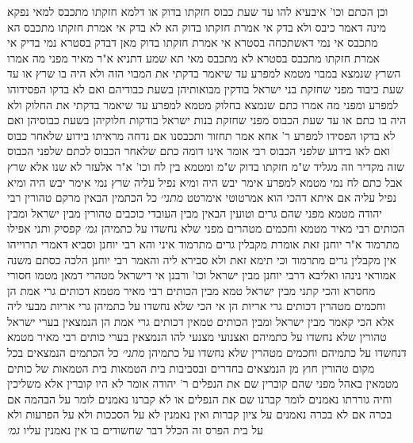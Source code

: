 \documentclass[12pt, openany]{book}
\begin{document}
{וכן הכתם וכו' איבעיא להו עד שעת כבוס חזקתו בדוק או דלמא חזקתו מתכבס 
למאי נפקא מינה דאמר כיבס ולא בדק אי אמרת חזקתו בדוק הא לא בדק אי אמרת חזקתו מתכבס הא מתכבס 
אי נמי דאשתכחה בסטרא אי אמרת חזקתו בדוק מאן דבדק בסטרא נמי בדיק אי אמרת חזקתו מתכבס בסטרא לא מתכבס 
מאי תא שמע דתניא א"ר מאיר מפני מה אמרו השרץ שנמצא במבוי מטמא למפרע עד שיאמר בדקתי את המבוי הזה ולא היה בו שרץ או עד שעת כיבוד מפני שחזקת בני ישראל בודקין מבואותיהן בשעת כבודיהם ואם לא בדקו הפסידוהו למפרע 
ומפני מה אמרו כתם שנמצא בחלוק מטמא למפרע עד שיאמר בדקתי את החלוק ולא היה בו כתם או עד שעת הכבוס מפני שחזקת בנות ישראל בודקות חלוקיהן בשעת כבוסיהן ואם לא בדקו הפסידו למפרע 
ר' אחא אמר תחזור ותכבסנו אם נדחה מראיתו בידוע שלאחר כבוס ואם לאו בידוע שלפני הכבוס 
רבי אומר אינו דומה כתם שלאחר הכבוס לכתם שלפני הכבוס שזה מקדיר וזה מגליד ש"מ חזקתו בדוק ש"מ
ומטמא בין לח וכו' א"ר אלעזר לא שנו אלא שרץ אבל כתם לח נמי מטמא למפרע אימר יבש היה ומיא נפיל עליה 
שרץ נמי אימר יבש היה ומיא נפיל עליה אם איתא דהכי הוא אמרטוטי אימרטט
{\large\emph{מתני׳}} כל הכתמין הבאין מרקם טהורין רבי יהודה מטמא מפני שהם גרים וטועין הבאין מבין העובדי כוכבים טהורין מבין ישראל ומבין הכותים רבי מאיר מטמא וחכמים מטהרים מפני שלא נחשדו על כתמיהן
{\large\emph{גמ׳}} קפסיק ותני אפילו מתרמוד א"ר יוחנן זאת אומרת מקבלין גרים מתרמוד 
איני והא רבי יוחנן וסביא דאמרי תרוייהו אין מקבלין גרים מתרמוד 
וכי תימא זאת ולא סבירא ליה והאמר רבי יוחנן הלכה כסתם משנה 
אמוראי נינהו ואליבא דרבי יוחנן
מבין ישראל וכו' ורבנן אי דישראל מטהרי דמאן מטמו 
חסורי מחסרא והכי קתני מבין ישראל טמא מבין הכותים רבי מאיר מטמא דכותים גרי אמת הן וחכמים מטהרין דכותים גרי אריות הן 
אי הכי שלא נחשדו על כתמיהן גרי אריות מבעי ליה 
אלא הכי קאמר מבין ישראל ומבין הכותים טמאין דכותים גרי אמת הן הנמצאין בערי ישראל טהורין שלא נחשדו על כתמיהם ואצנועי מצנעי להו 
הנמצאין בערי כותים רבי מאיר מטמא דנחשדו על כתמיהם וחכמים מטהרין שלא נחשדו על כתמיהן 
{\large\emph{מתני׳}} כל הכתמים הנמצאים בכל מקום טהורין חוץ מן הנמצאים בחדרים ובסביבות בית הטמאות
בית הטמאות של כותים מטמאין באהל מפני שהם קוברין שם את הנפלים ר' יהודה אומר לא היו קוברין אלא משליכין וחיה גוררתו 
נאמנים לומר קברנו שם את הנפלים או לא קברנו נאמנים לומר על הבהמה אם בכרה אם לא בכרה נאמנים על ציון קברות
ואין נאמנין לא על הסככות ולא על הפרעות ולא על בית הפרס 
זה הכלל דבר שחשודים בו אין נאמנין עליו {\large\emph{גמ׳}} }
\end{document}
